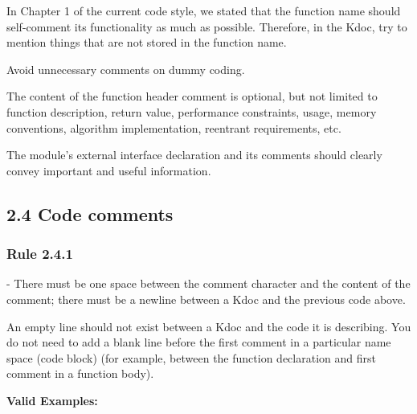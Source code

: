 In Chapter 1 of the current code style, we stated that the function name should self-comment its functionality as much as possible. Therefore, in the Kdoc, try to mention things that are not stored in the function name.

Avoid unnecessary comments on dummy coding.



The content of the function header comment is optional, but not limited to function description, return value, performance constraints, usage, memory conventions, algorithm implementation, reentrant requirements, etc.

The module's external interface declaration and its comments should clearly convey important and useful information.



\subsection*{\textbf{2.4 Code comments}}

\subsubsection*{\textbf{Rule 2.4.1}}
\leavevmode\newline



- There must be one space between the comment character and the content of the comment; there must be a newline between a Kdoc and the previous code above.

An empty line should not exist between a Kdoc and the code it is describing. You do not need to add a blank line before the first comment in a particular name space (code block) (for example, between the function declaration and first comment in a function body).



\textbf{Valid Examples:}

